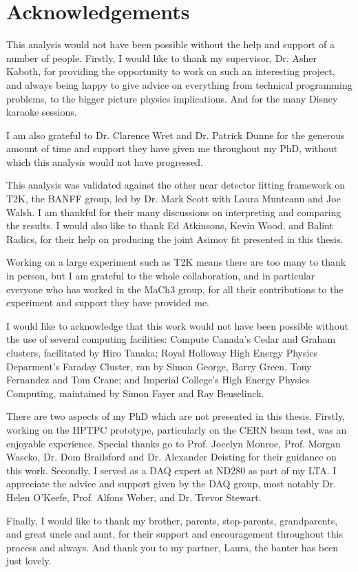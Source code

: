 \chapter*{Acknowledgements}

This analysis would not have been possible without the help and support of a number of people. Firstly, I would like to thank my supervisor, Dr. Asher Kaboth, for providing the opportunity to work on such an interesting project, and always being happy to give advice on everything from technical programming problems, to the bigger picture physics implications. And for the many Disney karaoke sessions.

I am also grateful to Dr. Clarence Wret and Dr. Patrick Dunne for the generous amount of time and support they have given me throughout my PhD, without which this analysis would not have progressed.

This analysis was validated against the other near detector fitting framework on T2K, the BANFF group, led by Dr. Mark Scott with Laura Munteanu and Joe Walsh. I am thankful for their many discussions on interpreting and comparing the results. I would also like to thank Ed Atkinsons, Kevin Wood, and Balint Radics, for their help on producing the joint Asimov fit presented in this thesis.

Working on a large experiment such as T2K means there are too many to thank in person, but I am grateful to the whole collaboration, and in particular everyone who has worked in the MaCh3 group, for all their contributions to the experiment and support they have provided me.

I would like to acknowledge that this work would not have been possible without the use of several computing facilities: Compute Canada's Cedar and Graham clusters, facilitated by Hiro Tanaka; Royal Holloway High Energy Physics Deparment's Faraday Cluster, ran by Simon George, Barry Green, Tony Fernandez and Tom Crane; and Imperial College's High Energy Physics Computing, maintained by Simon Fayer and Ray Beuselinck.

There are two aspects of my PhD which are not presented in this thesis. Firstly, working on the HPTPC prototype, particularly on the CERN beam test, was an enjoyable experience. Special thanks go to Prof. Jocelyn Monroe, Prof. Morgan Wascko, Dr. Dom Brailsford and Dr. Alexander Deisting for their guidance on this work. Secondly, I served as a DAQ expert at ND280 as part of my LTA. I appreciate the advice and support given by the DAQ group, most notably Dr. Helen O'Keefe, Prof. Alfons Weber, and Dr. Trevor Stewart.

Finally, I would like to thank my brother, parents, step-parents, grandparents, and great uncle and aunt, for their support and encouragement throughout this process and always. And thank you to my partner, Laura, the banter has been just lovely.






\newpage
